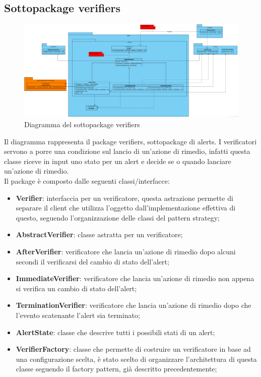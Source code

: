 \newpage

    \subsection{Sottopackage verifiers}

        \begin{figure}[htbp]
            \centering
            \includegraphics[width=\textwidth]{./img/DiagrammiClasse/verifiers.png}
            \caption[Diagramma del sottopackage verifiers]{Diagramma del sottopackage verifiers}
        \end{figure}
        Il diagramma rappresenta il package verifiers, sottopackage di alerts. I verificatori servono a
        porre una condizione sul lancio di un'azione di rimedio, infatti questa classe riceve in input uno 
        stato per un alert e decide se o quando lanciare un'azione di rimedio.\\
        Il package è composto dalle seguenti classi/interfacce:
        \begin{itemize}
        \item \textbf{Verifier}: interfaccia per un verificatore, questa astrazione permette di separare
        	il client che utilizza l'oggetto dall'implementazione effettiva di questo, seguendo l'organizzazione
        	delle classi del pattern strategy;
        \item \textbf{AbstractVerifier}: classe astratta per un verificatore;
        \item \textbf{AfterVerifier}: verificatore che lancia un'azione di rimedio dopo alcuni secondi il 
        	verificarsi del cambio di stato dell'alert;
        \item \textbf{ImmediateVerifier}: verificatore che lancia un'azione di rimedio non appena si verifica 
        	un cambio di stato dell'alert;
        \item \textbf{TerminationVerifier}: verificatore che lancia un'azione di rimedio dopo che l'evento 
        	scatenante l'alert sia terminato;
        \item \textbf{AlertState}: classe che descrive tutti i possibili stati di un alert;
        \item \textbf{VerifierFactory}: classe che permette di costruire un verificatore in base ad una 
        		configurazione scelta, è stato scelto di organizzare l'architettura di questa classe
        		seguendo il factory pattern, già descritto precedentemente;
        \end{itemize}

